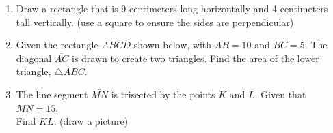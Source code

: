 \documentclass[12pt, twoside]{article}
\begin{document}
\begin{enumerate}
 \newpage
\item Draw a rectangle that is 9 centimeters long horizontally and 4 centimeters tall vertically. (use a square to ensure the sides are perpendicular)  \vspace{6cm}

\item Given the rectangle $ABCD$ shown below, with $AB=10$ and $BC=5$. The diagonal $\overline{AC}$ is drawn to create two triangles. Find the area of the lower triangle, $\triangle ABC$.
    \begin{flushleft}
    \end{flushleft}
    \vspace{3cm}

\item The line segment $\overline{MN}$ is trisected by the points $K$ and $L$. Given that $MN=15$. \\ Find $KL$. (draw a picture)

\end{enumerate}
\end{document}
